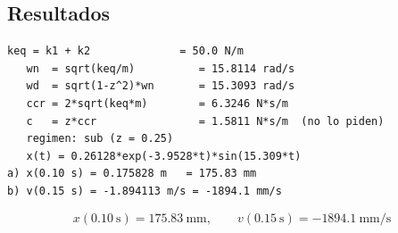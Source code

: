 \documentclass[12pt,letterpaper]{article}
\begin{document}
\subsection{Resultados}
\begin{lstlisting}[style=consola]
   keq = k1 + k2              = 50.0 N/m
   wn  = sqrt(keq/m)          = 15.8114 rad/s
   wd  = sqrt(1-z^2)*wn       = 15.3093 rad/s
   ccr = 2*sqrt(keq*m)        = 6.3246 N*s/m
   c   = z*ccr                = 1.5811 N*s/m  (no lo piden)
   regimen: sub (z = 0.25)
   x(t) = 0.26128*exp(-3.9528*t)*sin(15.309*t)
a) x(0.10 s) = 0.175828 m   = 175.83 mm
b) v(0.15 s) = -1.894113 m/s = -1894.1 mm/s
\end{lstlisting}

\begin{equation}
\boxed{\;x(0.10\ \text{s}) = 175.83\ \text{mm}, \qquad
v(0.15\ \text{s}) = -1894.1\ \text{mm/s}\;}
\end{equation}
\end{document}
